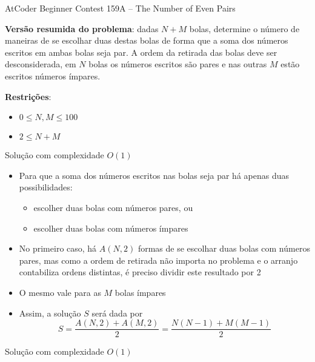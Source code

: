 \begin{frame}[fragile]{AtCoder Beginner Contest 159A -- The Number of Even Pairs}

    \textbf{Versão resumida do problema}: dadas $N + M$ bolas, determine o número de maneiras de
        se escolhar duas destas bolas de forma que a soma dos números escritos em ambas bolas seja
        par. A ordem da retirada das bolas deve ser desconsiderada, em $N$ bolas os números
        escritos são pares e nas outras $M$ estão escritos números ímpares.

    \vspace{0.1in}
    \textbf{Restrições}:
    \begin{itemize}
        \item $0\leq N, M\leq 100$
        \item $2\leq N + M$
    \end{itemize}
\end{frame}

\begin{frame}[fragile]{Solução com complexidade $O(1)$}

    \begin{itemize}
        \item Para que a soma dos números escritos nas bolas seja par há apenas duas
            possibilidades:
        \begin{itemize}
            \item escolher duas bolas com números pares, ou
            \item escolher duas bolas com números ímpares
        \end{itemize}

        \item No primeiro caso, há $A(N, 2)$ formas de se escolhar duas bolas com números
            pares, mas como a ordem de retirada não importa no problema e o arranjo contabiliza
            ordens distintas, é preciso dividir este resultado por 2

        \item O mesmo vale para as $M$ bolas ímpares

        \item Assim, a solução $S$ será dada por
        $$
            S = \frac{A(N, 2) + A(M, 2)}{2} = \frac{N(N - 1) + M(M - 1)}{2}
        $$
    \end{itemize}

\end{frame}

\begin{frame}[fragile]{Solução com complexidade $O(1)$}
\end{frame}
